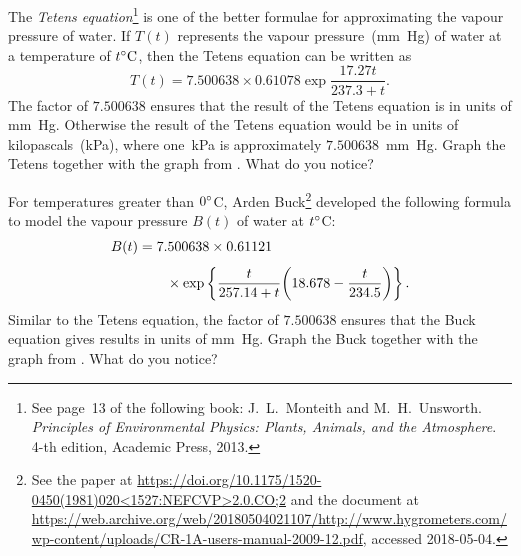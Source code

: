 \documentclass[a4paper,oneside,12pt]{article}
\begin{document}
\begin{problem}
\begin{packedenum}
  \item\label{subprob:vapour_pressure_Tetens}
    The \emph{Tetens equation}\footnote{
      See page~13 of the following book:
      J.~L.~Monteith and M.~H.~Unsworth.
      \emph{Principles of Environmental Physics: Plants, Animals, and
        the Atmosphere}. 4-th edition, Academic Press, 2013.
    }
    is one of the better formulae for approximating the vapour
    pressure of water.  If $T(t)$ represents the vapour
    pressure~(mm~Hg) of water at a temperature of ${t}^{\circ}\textrm{C}$, then
    the Tetens equation can be written as
    \begin{equation}
    \label{eqn:vapour_pressure_Tetens}
    T(t)
    =
    7.500638 \times 0.61078
    \exp{
      \frac{
        17.27t
      }{
        237.3 + t
      }
    }.
    \end{equation}
    The factor of $7.500638$ ensures that the result of the Tetens
    equation is in units of mm~Hg.  Otherwise the result of the Tetens
    equation would be in units of kilopascals~(kPa), where one~kPa is
    approximately $7.500638$~mm~Hg.  Graph the Tetens
     together with the graph
    from .  What do you notice?

  \item\label{subprob:vapour_pressure_Buck}
    For temperatures greater than ${0}^{\circ}$C, Arden Buck\footnote{
      See the paper at
      \url{https://doi.org/10.1175/1520-0450(1981)020<1527:NEFCVP>2.0.CO;2}
      and the document at
      \url{https://web.archive.org/web/20180504021107/http://www.hygrometers.com/wp-content/uploads/CR-1A-users-manual-2009-12.pdf},
      accessed 2018-05-04.
    }
    developed the following formula to model the vapour pressure
    $B(t)$ of water at ${t}^{\circ}$C:
    \begin{equation}
    \label{eqn:vapour_pressure_Buck}
    \begin{aligned}
    B(t)
    &=
    7.500638 \times 0.61121 \\[4pt]
    \amptab
    \times
    \exp{
      \frac{t}{257.14 + t}
      \parenthesis*{
        18.678 - \frac{t}{234.5}
      }
    }.
    \end{aligned}
    \end{equation}
    Similar to the Tetens equation, the factor of $7.500638$ ensures
    that the Buck equation gives results in units of mm~Hg.  Graph the
    Buck  together with the graph
    from .  What do you notice?


\end{packedenum}
\end{problem}
\end{document}
